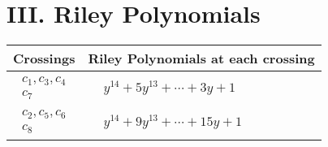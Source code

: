 \documentclass[1p]{elsarticle_modified}
\theoremstyle{definition}
\begin{document}
\centering \section*{ III. Riley Polynomials}
\begin{tabular}{m{50pt}|m{274pt}}
Crossings & \hspace{64pt}Riley Polynomials at each crossing \\
\hline $$\begin{aligned}c_{1},c_{3},c_{4}\\c_{7}\end{aligned}$$&$\begin{aligned}
&y^{14}+5 y^{13}+\cdots+3 y+1
\end{aligned}$\\
\hline $$\begin{aligned}c_{2},c_{5},c_{6}\\c_{8}\end{aligned}$$&$\begin{aligned}
&y^{14}+9 y^{13}+\cdots+15 y+1
\end{aligned}$\\
\hline
\end{tabular}
\vskip 2pc
\end{document}
